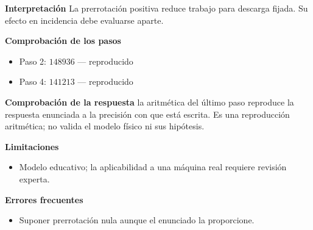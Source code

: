 \documentclass[10pt,openany]{book}
\begin{document}
\begin{tcolorbox}[title={Problema resuelto 4}, studiumworked, breakable]
\noindent\textbf{Interpretación}
La prerrotación positiva reduce trabajo para descarga fijada. Su efecto en incidencia debe evaluarse aparte.

\noindent\textbf{Comprobación de los pasos}
\begin{itemize}
\item Paso 2: $148936$ — reproducido
\item Paso 4: $141213$ — reproducido
\end{itemize}

\noindent\textbf{Comprobación de la respuesta} la aritmética del último paso reproduce la respuesta enunciada a la precisión con que está escrita. Es una reproducción aritmética; no valida el modelo físico ni sus hipótesis.

\noindent\textbf{Limitaciones}
\begin{itemize}
\item Modelo educativo; la aplicabilidad a una máquina real requiere revisión experta.
\end{itemize}

\noindent\textbf{Errores frecuentes}
\begin{itemize}
\item Suponer prerrotación nula aunque el enunciado la proporcione.
\end{itemize}
\end{tcolorbox}
\end{document}

